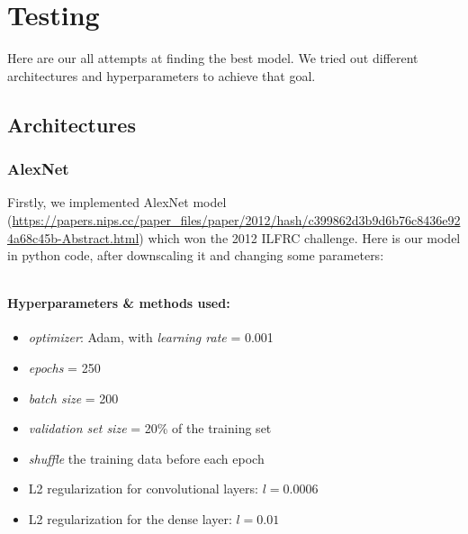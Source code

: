 \documentclass[12pt]{article}
\begin{document}
  \section{Testing}
    Here are our all attempts at finding the best model. We tried out different architectures and hyperparameters to achieve that goal.
    \subsection{Architectures}
      \subsubsection{AlexNet}
        Firstly, we implemented AlexNet model (\url{https://papers.nips.cc/paper_files/paper/2012/hash/c399862d3b9d6b76c8436e924a68c45b-Abstract.html})
        which won the 2012 ILFRC challenge. Here is our model in python code, after downscaling it and changing some parameters:
        \inputminted[linenos]{python}{code/alexnet.py}
        \paragraph{Hyperparameters \& methods used:}
          \begin{itemize}
            \item \textit{optimizer}: Adam, with \textit{learning rate} = 0.001
            \item \textit{epochs} = 250
            \item \textit{batch size} = 200
            \item \textit{validation set size} = 20\% of the training set
            \item \textit{shuffle} the training data before each epoch
            \item L2 regularization for convolutional layers: $l = 0.0006$
            \item L2 regularization for the dense layer: $l = 0.01$
          \end{itemize}
\end{document}
